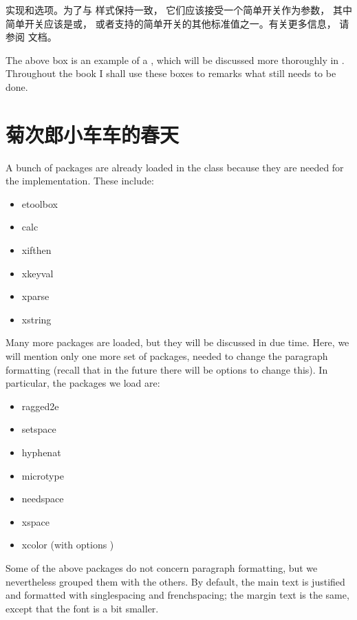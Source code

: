 \begin{kaobox}[frametitle=To Do]
实现和选项。为了与\KOMAScript\xspace 样式保持一致， 它们应该接受一个简单开关作为参数， 其中简单开关应该是或， 或者\KOMAScript 支持的简单开关的其他标准值之一。有关更多信息， 请参阅\KOMAScript\xspace 文档。
\end{kaobox}

The above box is an example of a , which will be
discussed more thoroughly in . Throughout the book I
shall use these boxes to remarks what still needs to be done.

\section{菊次郎小车车的春天}

A bunch of packages are already loaded in the class because they are
needed for the implementation. These include:

\begin{itemize}
	\item etoolbox
	\item calc
	\item xifthen
	\item xkeyval
	\item xparse
	\item xstring
\end{itemize}

Many more packages are loaded, but they will be discussed in due time.
Here, we will mention only one more set of packages, needed to change
the paragraph formatting (recall that in the future there will be
options to change this). In particular, the packages we load are:

\begin{itemize}
	\item ragged2e
	\item setspace
	\item hyphenat
	\item microtype
	\item needspace
	\item xspace
	\item xcolor (with options )
\end{itemize}

Some of the above packages do not concern paragraph formatting, but we
nevertheless grouped them with the others. By default, the main text is
justified and formatted with singlespacing and frenchspacing; the margin
text is the same, except that the font is a bit smaller.

